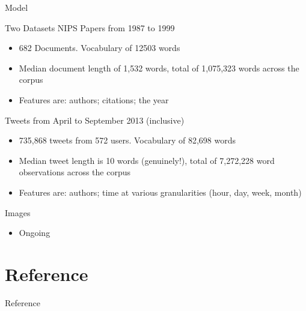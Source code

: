 \documentclass[xcolor=dvipsnames]{beamer}
\begin{document}

\begin{frame}{Model}

Two Datasets
NIPS Papers from 1987 to 1999
\begin{itemize}
    \item 682 Documents. Vocabulary of 12503 words
    \item Median document length of 1,532 words, total of 1,075,323 words across the corpus
    \item Features are: authors; citations; {\color{gray} the year}
\end{itemize}

Tweets from April to September 2013 (inclusive)
\begin{itemize}
    \item 735,868 tweets from 572 users. Vocabulary of 82,698 words
    \item Median tweet length is 10 words (genuinely!), total of 7,272,228 word observations across the corpus 
    \item Features are: authors; time at various granularities (hour, day, week, month)
\end{itemize}

Images
\begin{itemize}
    \item Ongoing
\end{itemize}

\end{frame}



\section{Reference}
\begin{frame}[allowframebreaks]{Reference}






\end{frame}
\end{document}
